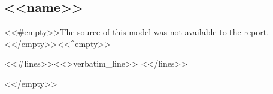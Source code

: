 \subsection{\texorpdfstring{<<name>>}{<<nameplain>>}}
\label{lst:<<slug>>}
<<#empty>>\noindent The source of this model was not available to the report.
<</empty>><<^empty>>\begin{vplisting}
<<#lines>><<>verbatim_line>>
<</lines>>\end{vplisting}
<</empty>>%
